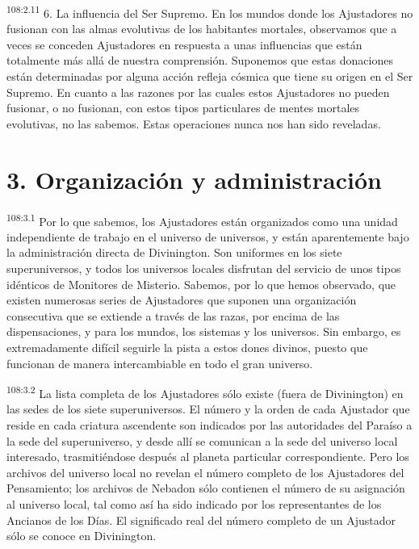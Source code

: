 \documentclass[twoside, 11pt]{book}
\begin{document}
\par
\textsuperscript{108:2.11} 6. La influencia del Ser Supremo. En los mundos donde los Ajustadores no fusionan con las almas evolutivas de los habitantes mortales, observamos que a veces se conceden Ajustadores en respuesta a unas influencias que están totalmente más allá de nuestra comprensión. Suponemos que estas donaciones están determinadas por alguna acción refleja cósmica que tiene su origen en el Ser Supremo. En cuanto a las razones por las cuales estos Ajustadores no pueden fusionar, o no fusionan, con estos tipos particulares de mentes mortales evolutivas, no las sabemos. Estas operaciones nunca nos han sido reveladas.

\section*{3. Organización y administración}
\par
\textsuperscript{108:3.1} Por lo que sabemos, los Ajustadores están organizados como una unidad independiente de trabajo en el universo de universos, y están aparentemente bajo la administración directa de Divinington. Son uniformes en los siete superuniversos, y todos los universos locales disfrutan del servicio de unos tipos idénticos de Monitores de Misterio. Sabemos, por lo que hemos observado, que existen numerosas series de Ajustadores que suponen una organización consecutiva que se extiende a través de las razas, por encima de las dispensaciones, y para los mundos, los sistemas y los universos. Sin embargo, es extremadamente difícil seguirle la pista a estos dones divinos, puesto que funcionan de manera intercambiable en todo el gran universo.

\par
\textsuperscript{108:3.2} La lista completa de los Ajustadores sólo existe (fuera de Divinington) en las sedes de los siete superuniversos. El número y la orden de cada Ajustador que reside en cada criatura ascendente son indicados por las autoridades del Paraíso a la sede del superuniverso, y desde allí se comunican a la sede del universo local interesado, trasmitiéndose después al planeta particular correspondiente. Pero los archivos del universo local no revelan el número completo de los Ajustadores del Pensamiento; los archivos de Nebadon sólo contienen el número de su asignación al universo local, tal como así ha sido indicado por los representantes de los Ancianos de los Días. El significado real del número completo de un Ajustador sólo se conoce en Divinington.
\end{document}
